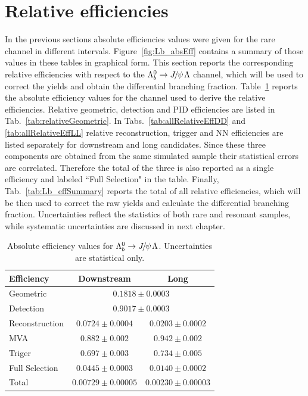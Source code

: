\section{Relative efficiencies}

In the previous sections absolute efficiencies values were given for the rare channel in different \qsq intervals.
Figure~\ref{fig:Lb_absEff} contains a summary of those values in these tables in graphical form.
This section reports the corresponding relative efficiencies with respect to the $\Lb\to\jpsi\Lz$ channel, which will be
used to correct the yields and obtain the differential branching fraction. Table~\ref{tab:jpsiEff} reports the absolute 
efficiency values for the \jpsi channel used to derive the relative efficiencies.
Relative geometric, detection and PID efficiencies are listed in Tab.~\ref{tab:relativeGeometric}.
In Tabs.~\ref{tab:allRelativeEffDD} and \ref{tab:allRelativeEffLL} relative reconstruction, trigger and NN efficiencies 
are listed separately for downstream and long candidates. Since these three components are obtained from the 
same simulated sample their statistical errors are correlated. Therefore the total of the three is also reported 
as a single efficiency and labeled ``Full Selection" in the table.
Finally, Tab.~\ref{tab:Lb_effSummary} reports the total of all relative efficiencies, which will be then used
to correct the raw yields and calculate the differential branching fraction.
Uncertainties reflect the statistics of both rare and resonant samples, while systematic uncertainties are discussed in next chapter.

\begin{table}
\centering
\caption{Absolute efficiency values for $\Lb\to\jpsi\Lz$. Uncertainties are statistical only.}
\begin{tabular}{lcc} \hline
Efficiency		& 	Downstream				& 	Long				\\  \hline		
Geometric 		&   	\multicolumn{2}{c}{	$0.1818 \pm 0.0003$ } 	\\	
Detection 		&   	\multicolumn{2}{c}{	$0.9017 \pm 0.0003$ } 	\\
Reconstruction 	& 	$0.0724 \pm 0.0004$   & $0.0203 \pm 0.0002$     \\
MVA 			&	$0.882 \pm 0.002$   & $0.942 \pm 0.002$     \\
Triger 			&	$0.697 \pm 0.003$   & $0.734 \pm 0.005$     \\ \hline
Full Selection	&	$0.0445 \pm 0.0003$   & $0.0140 \pm 0.0002$     \\ \hline
Total  			&	$0.00729 \pm 0.00005$   & $0.00230 \pm 0.00003$    	\\
\end{tabular}
\label{tab:jpsiEff}
\end{table}


